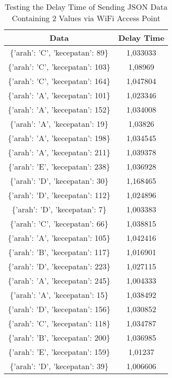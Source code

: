 \begin{table}[!h]
\centering
  \caption{Testing the Delay Time of Sending JSON Data Containing 2 Values via WiFi Access Point}
  \label{tbl:delayWiFiJSON}
  \begin{tabular}{|c|c|}
  \hline
  Data                              & Delay Time  \\ \hline
  \{'arah': 'C', 'kecepatan': 89\}  & 1,033033    \\ \hline
  \{'arah': 'C', 'kecepatan': 103\} & 1,08969     \\ \hline
  \{'arah': 'C', 'kecepatan': 164\} & 1,047804    \\ \hline
  \{'arah': 'A', 'kecepatan': 101\} & 1,023346    \\ \hline
  \{'arah': 'A', 'kecepatan': 152\} & 1,034008    \\ \hline
  \{'arah': 'A', 'kecepatan': 19\}  & 1,03826     \\ \hline
  \{'arah': 'A', 'kecepatan': 198\} & 1,034545    \\ \hline
  \{'arah': 'A', 'kecepatan': 211\} & 1,039378    \\ \hline
  \{'arah': 'E', 'kecepatan': 238\} & 1,036928    \\ \hline
  \{'arah': 'D', 'kecepatan': 30\}  & 1,168465    \\ \hline
  \{'arah': 'D', 'kecepatan': 112\} & 1,024896    \\ \hline
  \{'arah': 'D', 'kecepatan': 7\}   & 1,003383    \\ \hline
  \{'arah': 'C', 'kecepatan': 66\}  & 1,038815    \\ \hline
  \{'arah': 'A', 'kecepatan': 105\} & 1,042416    \\ \hline
  \{'arah': 'B', 'kecepatan': 117\} & 1,016901    \\ \hline
  \{'arah': 'D', 'kecepatan': 223\} & 1,027115    \\ \hline
  \{'arah': 'A', 'kecepatan': 245\} & 1,004333    \\ \hline
  \{'arah': 'A', 'kecepatan': 15\}  & 1,038492    \\ \hline
  \{'arah': 'D', 'kecepatan': 156\} & 1,030852    \\ \hline
  \{'arah': 'C', 'kecepatan': 118\} & 1,034787    \\ \hline
  \{'arah': 'B', 'kecepatan': 200\} & 1,036985    \\ \hline
  \{'arah': 'E', 'kecepatan': 159\} & 1,01237     \\ \hline
  \{'arah': 'D', 'kecepatan': 39\}  & 1,006606    \\ \hline

\end{tabular}
\end{table}
